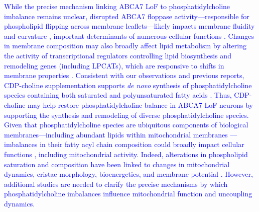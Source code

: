 \newcommand{\quoteI}{\textcolor{blue}{While the precise mechanism linking ABCA7 LoF to phosphatidylcholine imbalance remains unclear, disrupted ABCA7 floppase activity—responsible for phospholipid flipping across membrane leaflets—likely impacts membrane fluidity and curvature \cite{Takada2018-ce,Renne2018-fc}, important determinants of numerous cellular functions \cite{McMahon2015-gy,Yang2024-tz}. Changes in membrane composition may also broadly affect lipid metabolism by altering the activity of transcriptional regulators controlling lipid biosynthesis and remodeling genes (including LPCATs), which are responsive to shifts in membrane properties \cite{Ballweg2020-rv,Covino2018-hz}. Consistent with our observations and previous reports, CDP-choline supplementation supports \textit{de novo} synthesis of phosphatidylcholine species containing both saturated and polyunsaturated fatty acids \cite{Boumann2003-im}. Thus, CDP-choline may help restore phosphatidylcholine balance in ABCA7 LoF neurons by supporting the synthesis and remodeling of diverse phosphatidylcholine species. Given that phosphatidylcholine species are ubiquitous components of biological membranes—including abundant lipids within mitochondrial membranes \cite{Decker2024-ae}—imbalances in their fatty acyl chain composition could broadly impact cellular functions \cite{Wang2019-om,Van_der_Veen2017-ei}, including mitochondrial activity. Indeed, alterations in phospholipid saturation and composition have been linked to changes in mitochondrial dynamics, cristae morphology, bioenergetics, and membrane potential \cite{Decker2024-ae,Adachi2016-tg}. However, additional studies are needed to clarify the precise mechanisms by which phosphatidylcholine imbalances influence mitochondrial function and uncoupling dynamics.\label{quoteI-label}}} 
\quoteI


